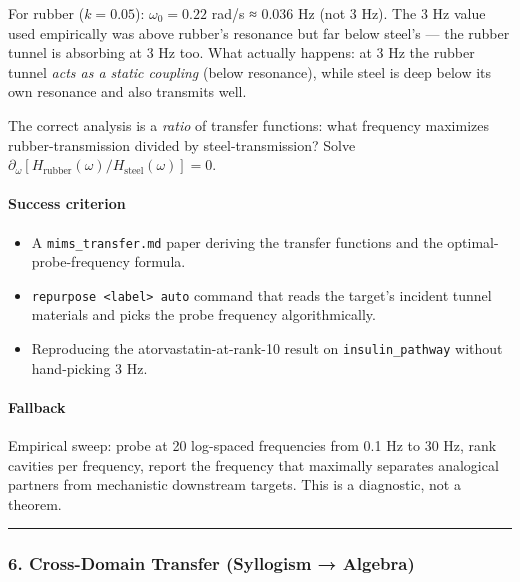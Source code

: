 \documentclass[
  11pt,
  a4paper,
]{article}
\providecommand{\tightlist}{%
  \setlength{\itemsep}{0pt}\setlength{\parskip}{0pt}}
\begin{document}
For rubber (\(k=0.05\)): \(\omega_0 = 0.22\) rad/s ≈ 0.036 Hz (not 3
Hz). The 3 Hz value used empirically was above rubber's resonance but
far below steel's --- the rubber tunnel is absorbing at 3 Hz too. What
actually happens: at 3 Hz the rubber tunnel \emph{acts as a static
coupling} (below resonance), while steel is deep below its own resonance
and also transmits well.

The correct analysis is a \emph{ratio} of transfer functions: what
frequency maximizes rubber-transmission divided by steel-transmission?
Solve
\(\partial_\omega [H_\text{rubber}(\omega) / H_\text{steel}(\omega)] = 0\).

\paragraph{Success criterion}\label{success-criterion-4}

\begin{itemize}
\tightlist
\item
  A \texttt{mims\_transfer.md} paper deriving the transfer functions and
  the optimal-probe-frequency formula.
\item
  \texttt{repurpose\ \textless{}label\textgreater{}\ auto} command that
  reads the target's incident tunnel materials and picks the probe
  frequency algorithmically.
\item
  Reproducing the atorvastatin-at-rank-10 result on
  \texttt{insulin\_pathway} without hand-picking 3 Hz.
\end{itemize}

\paragraph{Fallback}\label{fallback-1}

Empirical sweep: probe at 20 log-spaced frequencies from 0.1 Hz to 30
Hz, rank cavities per frequency, report the frequency that maximally
separates analogical partners from mechanistic downstream targets. This
is a diagnostic, not a theorem.

\begin{center}\rule{0.5\linewidth}{0.5pt}\end{center}

\subsubsection{6. Cross-Domain Transfer (Syllogism →
Algebra)}\label{cross-domain-transfer-syllogism-algebra-1}
\end{document}
